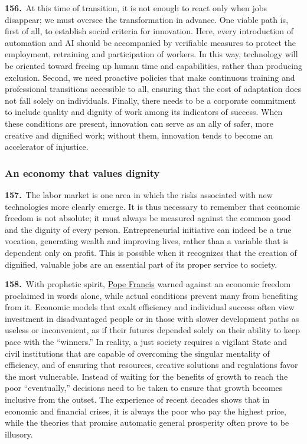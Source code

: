 \documentclass{article}
\begin{document}
\textbf{156.}\ At this time of transition, it is not enough to react only when jobs disappear; we must oversee the transformation in advance. One viable path is, first of all, to establish social criteria for innovation. Here, every introduction of automation and AI should be accompanied by verifiable measures to protect the employment, retraining and participation of workers. In this way, technology will be oriented toward freeing up human time and capabilities, rather than producing exclusion. Second, we need proactive policies that make continuous training and professional transitions accessible to all, ensuring that the cost of adaptation does not fall solely on individuals. Finally, there needs to be a corporate commitment to include quality and dignity of work among its indicators of success. When these conditions are present, innovation can serve as an ally of safer, more creative and dignified work; without them, innovation tends to become an accelerator of injustice.

\subsubsection{An economy that values dignity}

\textbf{157.}\ The labor market is one area in which the risks associated with new technologies more clearly emerge. It is thus necessary to remember that economic freedom is not absolute; it must always be measured against the common good and the dignity of every person. Entrepreneurial initiative can indeed be a true vocation, generating wealth and improving lives, rather than a variable that is dependent only on profit. This is possible when it recognizes that the creation of dignified, valuable jobs are an essential part of its proper service to society.\cite{n158}

\textbf{158.}\ With prophetic spirit, \href{https://www.vatican.va/content/francesco/en.html}{Pope Francis} warned against an economic freedom proclaimed in words alone, while actual conditions prevent many from benefiting from it.\cite{n159} Economic models that exalt efficiency and individual success often view investment in disadvantaged people or in those with slower development paths as useless or inconvenient, as if their futures depended solely on their ability to keep pace with the ``winners.'' In reality, a just society requires a vigilant State and civil institutions that are capable of overcoming the singular mentality of efficiency, and of ensuring that resources, creative solutions and regulations favor the most vulnerable.\cite{n160} Instead of waiting for the benefits of growth to reach the poor ``eventually,'' decisions need to be taken to ensure that growth becomes inclusive from the outset. The experience of recent decades shows that in economic and financial crises, it is always the poor who pay the highest price, while the theories that promise automatic general prosperity often prove to be illusory.
\end{document}
